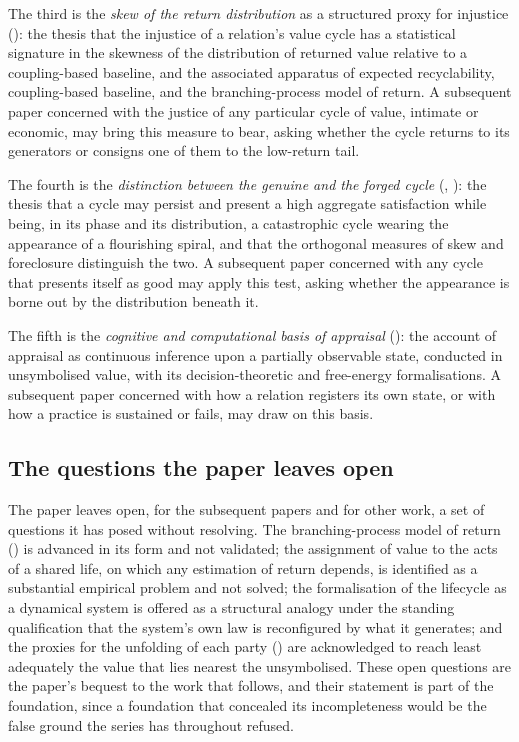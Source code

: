 The third is the \emph{skew of the return distribution} as a structured proxy for injustice (): the thesis that the injustice of a relation's value cycle has a statistical signature in the skewness of the distribution of returned value relative to a coupling-based baseline, and the associated apparatus of expected recyclability, coupling-based baseline, and the branching-process model of return. A subsequent paper concerned with the justice of any particular cycle of value, intimate or economic, may bring this measure to bear, asking whether the cycle returns to its generators or consigns one of them to the low-return tail.

The fourth is the \emph{distinction between the genuine and the forged cycle} (, ): the thesis that a cycle may persist and present a high aggregate satisfaction while being, in its phase and its distribution, a catastrophic cycle wearing the appearance of a flourishing spiral, and that the orthogonal measures of skew and foreclosure distinguish the two. A subsequent paper concerned with any cycle that presents itself as good may apply this test, asking whether the appearance is borne out by the distribution beneath it.

The fifth is the \emph{cognitive and computational basis of appraisal} (): the account of appraisal as continuous inference upon a partially observable state, conducted in unsymbolised value, with its decision-theoretic and free-energy formalisations. A subsequent paper concerned with how a relation registers its own state, or with how a practice is sustained or fails, may draw on this basis.

\subsection{The questions the paper leaves open}
\label{p11:sec:found-open}

The paper leaves open, for the subsequent papers and for other work, a set of questions it has posed without resolving. The branching-process model of return () is advanced in its form and not validated; the assignment of value to the acts of a shared life, on which any estimation of return depends, is identified as a substantial empirical problem and not solved; the formalisation of the lifecycle as a dynamical system is offered as a structural analogy under the standing qualification that the system's own law is reconfigured by what it generates; and the proxies for the unfolding of each party () are acknowledged to reach least adequately the value that lies nearest the unsymbolised. These open questions are the paper's bequest to the work that follows, and their statement is part of the foundation, since a foundation that concealed its incompleteness would be the false ground the series has throughout refused.

